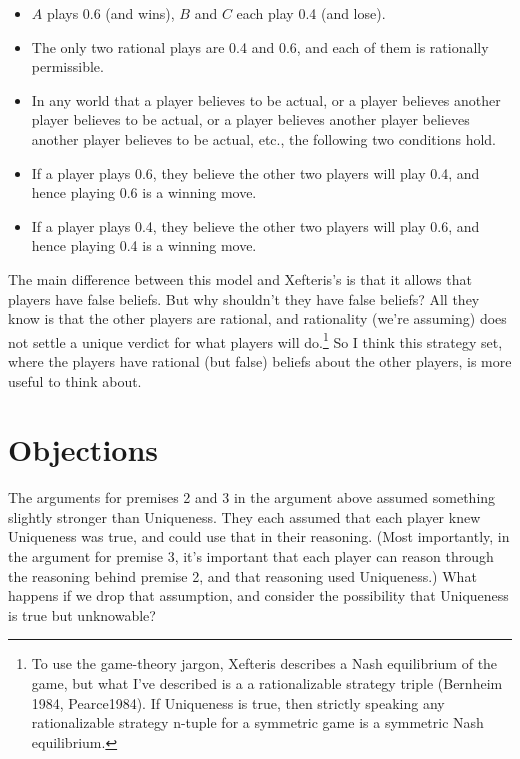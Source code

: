 \documentclass[
  11pt,
]{article}
\providecommand{\tightlist}{%
  \setlength{\itemsep}{0pt}\setlength{\parskip}{0pt}}
\begin{document}
\begin{itemize}
\tightlist
\item
  \(A\) plays 0.6 (and wins), \(B\) and \(C\) each play 0.4 (and lose).
\item
  The only two rational plays are 0.4 and 0.6, and each of them is rationally permissible.
\item
  In any world that a player believes to be actual, or a player believes another player believes to be actual, or a player believes another player believes another player believes to be actual, etc., the following two conditions hold.
\item
  If a player plays 0.6, they believe the other two players will play 0.4, and hence playing 0.6 is a winning move.
\item
  If a player plays 0.4, they believe the other two players will play 0.6, and hence playing 0.4 is a winning move.
\end{itemize}

The main difference between this model and Xefteris's is that it allows that players have false beliefs. But why shouldn't they have false beliefs? All they know is that the other players are rational, and rationality (we're assuming) does not settle a unique verdict for what players will do.\footnote{To use the game-theory jargon, Xefteris describes a Nash equilibrium of the game, but what I've described is a a rationalizable strategy triple (Bernheim 1984, Pearce1984). If Uniqueness is true, then strictly speaking any rationalizable strategy n-tuple for a symmetric game is a symmetric Nash equilibrium.} So I think this strategy set, where the players have rational (but false) beliefs about the other players, is more useful to think about.

\hypertarget{objections}{%
\section{Objections}\label{objections}}

The arguments for premises 2 and 3 in the argument above assumed something slightly stronger than Uniqueness. They each assumed that each player knew Uniqueness was true, and could use that in their reasoning. (Most importantly, in the argument for premise 3, it's important that each player can reason through the reasoning behind premise 2, and that reasoning used Uniqueness.) What happens if we drop that assumption, and consider the possibility that Uniqueness is true but unknowable?
\end{document}
